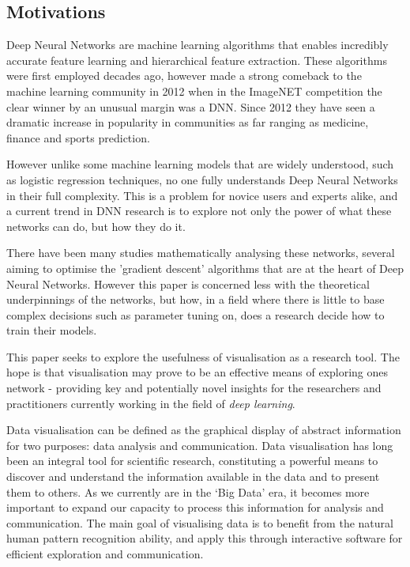 \documentclass[a4paper,11pt,titlepage]{article}
\begin{document}
	\subsection{Motivations}
	Deep Neural Networks are machine learning algorithms that enables incredibly accurate feature learning and hierarchical feature extraction. These algorithms were first employed decades ago, however made a strong comeback to the machine learning community in 2012 when in the ImageNET competition the clear winner by an unusual margin was a DNN. Since 2012 they have seen a dramatic increase in popularity in communities as far ranging as medicine, finance and sports prediction.
\par 
However unlike some machine learning models that are widely understood, such as logistic regression techniques, no one fully understands Deep Neural Networks in their full complexity. This is a problem for novice users and experts alike, and a current trend in DNN research is to explore not only the power of what these networks can do, but how they do it.
\par
There have been many studies mathematically analysing these networks, several aiming to optimise the 'gradient descent' algorithms that are at the heart of Deep Neural Networks. However this paper is concerned less with the theoretical underpinnings of the networks, but how, in a field where there is little to base complex decisions such as parameter tuning on, does a research decide how to train their models. 
\par
This paper seeks to explore the usefulness of visualisation as a research tool. The hope is that visualisation may prove to be an effective means of exploring ones network - providing key and potentially novel insights for the researchers and practitioners currently working in the field of \textit{deep learning}.
\par
Data visualisation can be defined as the graphical display of abstract information for two purposes: data analysis and communication. Data visualisation has long been an integral tool for scientific research, constituting a powerful means to discover and understand the information available in the data and to present them to others. As we currently are in the `Big Data' era, it becomes more important to expand our capacity to process this information for analysis and communication. The main goal of visualising data is to benefit from the natural human pattern recognition ability, and apply this through interactive software for efficient exploration and communication. 
\clearpage
\end{document}

